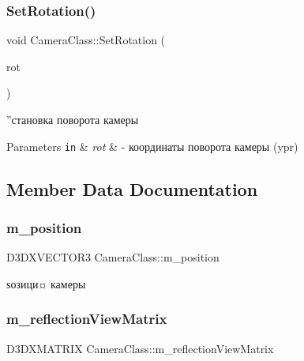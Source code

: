 \subsubsection{\texorpdfstring{Set\+Rotation()}{SetRotation()}}
{\footnotesize\ttfamily void Camera\+Class\+::\+Set\+Rotation (\begin{DoxyParamCaption}\item[{D3\+D\+X\+V\+E\+C\+T\+O\+R3}]{rot }\end{DoxyParamCaption})}



”становка поворота камеры 


\begin{DoxyParams}[1]{Parameters}
\mbox{\tt in}  & {\em rot} & -\/ координаты поворота камеры (ypr) \\
\hline
\end{DoxyParams}


\subsection{Member Data Documentation}
\mbox{\label{class_camera_class_ab72eca107da81697f9171a918de22c66}} 
\subsubsection{\texorpdfstring{m\+\_\+position}{m\_position}}
{\footnotesize\ttfamily D3\+D\+X\+V\+E\+C\+T\+O\+R3 Camera\+Class\+::m\+\_\+position\hspace{0.3cm}{\ttfamily [private]}}



ѕозици¤ камеры 

\mbox{\label{class_camera_class_ad99ce76f2bb5f3ddeb668fd530d7e88c}} 
\subsubsection{\texorpdfstring{m\+\_\+reflection\+View\+Matrix}{m\_reflectionViewMatrix}}
{\footnotesize\ttfamily D3\+D\+X\+M\+A\+T\+R\+IX Camera\+Class\+::m\+\_\+reflection\+View\+Matrix\hspace{0.3cm}{\ttfamily [private]}}



